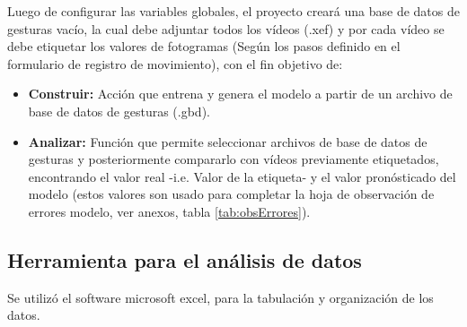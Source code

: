 Luego de configurar las variables globales, el proyecto crear\'a una base de datos de gesturas vac\'io, la cual debe adjuntar todos los v\'ideos (.xef)  y por cada v\'ideo se debe etiquetar los valores de fotogramas (Seg\'un los pasos definido en el formulario de registro de movimiento), con el fin objetivo de: 
\begin{itemize}
\item \textbf{Construir:} Acci\'on que entrena y genera el modelo a partir de un archivo de base de datos de gesturas (.gbd).
\item \textbf{Analizar:} Funci\'on que permite seleccionar archivos de base de datos de gesturas y posteriormente compararlo con v\'ideos previamente etiquetados, encontrando el valor real -i.e. Valor de la etiqueta- y el valor pron\'osticado del modelo (estos valores son usado para completar la hoja de observaci\'on de errores modelo, ver anexos, tabla \ref{tab:obsErrores}).
\end{itemize}
\subsection{Herramienta para el an\'alisis de datos} \label{ins:toolsAn}
Se utiliz\'o el software microsoft excel, para la tabulaci\'on y organizaci\'on de los datos.